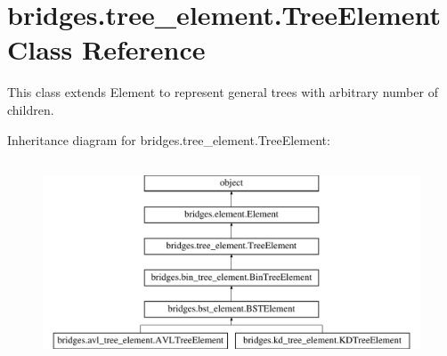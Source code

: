 \hypertarget{classbridges_1_1tree__element_1_1_tree_element}{}\section{bridges.\+tree\+\_\+element.\+Tree\+Element Class Reference}
\label{classbridges_1_1tree__element_1_1_tree_element}


This class extends Element to represent general trees with arbitrary number of children.  


Inheritance diagram for bridges.\+tree\+\_\+element.\+Tree\+Element\+:\begin{figure}[H]
\begin{center}
\leavevmode
\includegraphics[height=6.000000cm]{classbridges_1_1tree__element_1_1_tree_element}
\end{center}
\end{figure}
